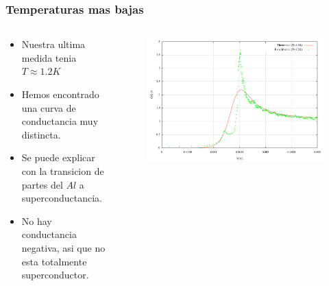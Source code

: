 \frame
{
  \frametitle{Temperaturas mas bajas}
    \begin{columns}
\begin{column}{0.6\textwidth}
     \begin{itemize}
      \item<1-> Nuestra ultima medida tenia $T\approx 1.2K$
      \item<2-> Hemos encontrado una curva de conductancia muy distincta.
      \item<3-> Se puede explicar con la transicion de partes del $Al$ a superconductancia.
      \item<4-> No hay conductancia negativa, asi que no esta totalmente superconductor.
     \end{itemize}
     
       \end{column}
\begin{column}{0.4\textwidth}
	\begin{figure}[!h] \label{sample}
	\includegraphics[width=\textwidth]{gv_theo_exp_10}
	\end{figure}
\end{column}
\end{columns} 

 }

